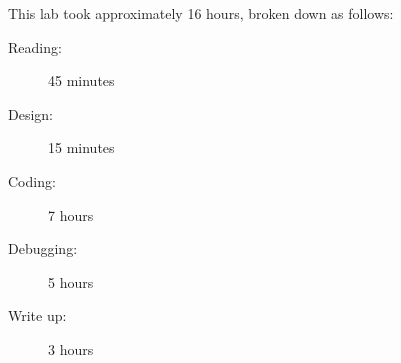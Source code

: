 \documentclass[11pt, titlepage]{article}
\begin{document}
        This lab took approximately 16 hours, broken down as follows:
        \begin{description}
            \item[Reading:] 45 minutes
            \item[Design:] 15 minutes
            \item[Coding:] 7 hours
            \item[Debugging:] 5 hours
            \item[Write up:] 3 hours
        \end{description}   
        
\end{document}
